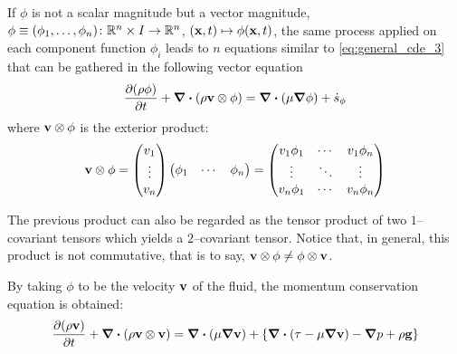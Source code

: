 If $\phi$ is not a scalar magnitude but a vector magnitude, \ie $\phi \equiv (\phi_1, \ldots, \phi_n) \colon \mathbb{R}^n \times I \to \mathbb{R}^n$, $(\vb{x}, t) \mapsto \phi(\vb{x}, t)$, the same process applied on each component function $\phi_i$ leads to $n$ equations similar to \eqref{eq:general_cde_3} that can be gathered in the following vector equation
\begin{equation}
	\pdv{(\rho \phi)}{t} + \div(\rho \vb{v} \otimes \phi) = 
	\div(\mu \grad{\phi}) + \dot{s}_\phi
\end{equation}
where $\vb{v} \otimes \phi$ is the exterior product:
\begin{equation}
	\vb{v} \otimes \phi =	
	\begin{pmatrix}
		v_1 \\ \vdots \\ v_n
	\end{pmatrix}
	\begin{pmatrix}
		\phi_1 & \cdots & \phi_n
	\end{pmatrix} = 
	\begin{pmatrix}
		v_1 \phi_1  & \cdots & v_1 \phi_n \\
		\vdots & \ddots & \vdots \\
		v_n \phi_1  & \cdots & v_n \phi_n
	\end{pmatrix}
\end{equation}

The previous product can also be regarded as the tensor product of two $1$--covariant tensors which yields a $2$--covariant tensor. Notice that, in general, this product is not commutative, that is to say, $\vb{v} \otimes \phi \neq \phi \otimes \vb{v}$.

By taking $\phi$ to be the velocity $\vb{v}$ of the fluid, the momentum conservation equation is obtained:
\begin{equation}
	\pdv{(\rho \vb{v})}{t} + \div(\rho \vb{v} \otimes \vb{v}) = 
	\div(\mu \grad{\vb{v}}) + \left\{ \div(\vb{\tau - \mu \grad{\vb{v}}}) - \grad{p} + \rho \vb{g} \right\}
\end{equation}



